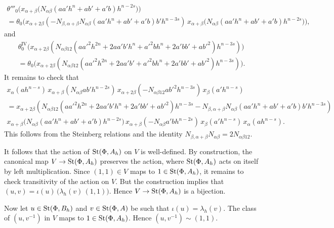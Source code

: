 \documentclass[oneside, 11pt]{amsart} \pdfoutput=1
\begin{document}
\begin{multline*}
\theta'''_0\bigl(x_{\alpha + \beta}\bigl(N_{\alpha \beta} (aa'h^n + ab' + a'b) h^{n - 2s}\bigr)\bigr)\\
= \theta_0\bigl(x_{\alpha + 2\beta}(-N_{\beta, \alpha + \beta} N_{\alpha \beta} (aa'h^n + ab' + a'b) b' h^{n - 3s})\, x_{\alpha + \beta}\bigl(N_{\alpha \beta} (aa'h^n + ab' + a'b) h^{n - 2s}\bigr)\bigr),
\end{multline*}
and
\begin{multline*}
\theta^{\mathrm{IV}}_0\bigl(x_{\alpha + 2\beta}(N_{\alpha \beta 12} (a{a'}^2 h^{2n} + 2aa'b' h^n + {a'}^2 bh^n + 2a'bb' + a{b'}^2) h^{n - 3s})\bigr)\\
= \theta_0\bigl(x_{\alpha + 2\beta}(N_{\alpha \beta 12} (a{a'}^2 h^{2n} + 2aa'b' + {a'}^2 bh^n + 2a'bb' + a{b'}^2) h^{n - 3s})\bigr).
\end{multline*}
It remains to check that
\begin{multline*}
x_\alpha(ah^{n - s})\, x_{\alpha + \beta}(N_{\alpha\beta} ab'h^{n - 2s})\, x_{\alpha + 2\beta}(-N_{\alpha\beta 12} a{b'}^2 h^{n - 3s})\, x_\beta(a' h^{n - s})\\
= x_{\alpha + 2\beta}(N_{\alpha \beta 12} (a{a'}^2 h^{2n} + 2aa'b' h^n + 2a'bb' + a{b'}^2) h^{n - 3s} - N_{\beta, \alpha + \beta} N_{\alpha \beta} (aa'h^n + ab' + a'b) b' h^{n - 3s})\\
x_{\alpha + \beta}\bigl(N_{\alpha \beta} (aa'h^n + ab' + a'b) h^{n - 2s}\bigr)\, x_{\alpha + \beta}(-N_{\alpha \beta} a'bh^{n - 2s})\, x_\beta(a'h^{n - s})\, x_\alpha(ah^{n - s}).
\end{multline*}
This follows from the Steinberg relations and the identity \(N_{\beta, \alpha + \beta} N_{\alpha \beta} = 2 N_{\alpha \beta 1 2}\).



It follows that the action of $\mathop{\mathrm{St}}\nolimits(\Phi, A_h)$ on $V$ is well-defined. By construction, the canonical map \(V \to \mathop{\mathrm{St}}\nolimits(\Phi, A_h)\) preserves the action, where \(\mathop{\mathrm{St}}\nolimits(\Phi, A_h)\) acts on itself by left multiplication. Since \((1, 1) \in V\) maps to \(1 \in \mathop{\mathrm{St}}\nolimits(\Phi, A_h)\), it remains to check transitivity of the action on \(V\). But the construction implies that \((u, v) = \iota(u)\, \bigl(\lambda_h(v)\, (1, 1)\bigr)\). Hence \(V \to \mathop{\mathrm{St}}\nolimits(\Phi, A_h)\) is a bijection.

Now let \(u \in \mathop{\mathrm{St}}\nolimits(\Phi, B_h)\) and \(v \in \mathop{\mathrm{St}}\nolimits(\Phi, A)\) be such that \(\iota(u) = \lambda_h(v)\). The class of \((u, v^{-1})\) in \(V\) maps to \(1 \in \mathop{\mathrm{St}}\nolimits(\Phi, A_h)\). Hence \((u, v^{-1}) \sim (1, 1)\).
\end{document}
